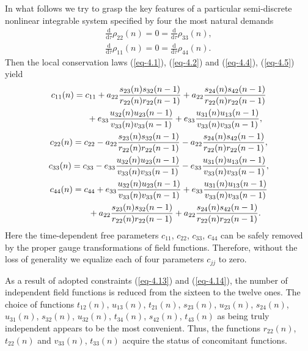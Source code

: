 \documentclass[pdftex]{sigma}
\numberwithin{equation}{section}
\begin{document}
In what follows we try to grasp the key features of a particular semi-discrete nonlinear integrable system specified by four the most natural demands
\begin{gather}\label{eq-4.13}
	\frac{\mathrm{d}}{\mathrm{d}\tau}\rho_{22}(n)=0=\frac{\mathrm{d}}{\mathrm{d}\tau}\rho_{33}(n),
\\ \label{eq-4.14}
	\frac{\mathrm{d}}{\mathrm{d}\tau}\rho_{11}(n)=0=\frac{\mathrm{d}}{\mathrm{d}\tau}\rho_{44}(n) .
\end{gather}
Then the local conservation laws (\ref{eq-4.1}), (\ref{eq-4.2}) and (\ref{eq-4.4}), (\ref{eq-4.5}) yield
\begin{gather}
	c_{11}(n)=c_{11}+a_{22}\frac{s_{23}(n)s_{32}(n-1)}{r_{22}(n)r_{22}(n-1)}+ a_{22}\frac{s_{24}(n)s_{42}(n-1)}{r_{22}(n)r_{22}(n-1)}\nonumber\\
\hphantom{c_{11}(n)=}{}
+e_{33}\frac{u_{32}(n)u_{23}(n-1)}{v_{33}(n)v_{33}(n-1)}+ e_{33}\frac{u_{31}(n)u_{13}(n-1)}{v_{33}(n)v_{33}(n-1)},\label{eq-4.15}
\\
	c_{22}(n)=c_{22}-a_{22}\frac{s_{23}(n)s_{32}(n-1)}{r_{22}(n)r_{22}(n-1)}- a_{22}\frac{s_{24}(n)s_{42}(n-1)}{r_{22}(n)r_{22}(n-1)}, \label{eq-4.16}
\\
 c_{33}(n)=c_{33}-e_{33}\frac{u_{32}(n)u_{23}(n-1)}{v_{33}(n)v_{33}(n-1)}- e_{33}\frac{u_{31}(n)u_{13}(n-1)}{v_{33}(n)v_{33}(n-1)}, \label{eq-4.17}
\\
	c_{44}(n)=c_{44}+e_{33}\frac{u_{32}(n)u_{23}(n-1)}{v_{33}(n)v_{33}(n-1)}+ e_{33}\frac{u_{31}(n)u_{13}(n-1)}{v_{33}(n)v_{33}(n-1)}\nonumber\\
\hphantom{c_{44}(n)=}{}
	+a_{22}\frac{s_{23}(n)s_{32}(n-1)}{r_{22}(n)r_{22}(n-1)}+ a_{22}\frac{s_{24}(n)s_{42}(n-1)}{r_{22}(n)r_{22}(n-1)} . \label{eq-4.18}
\end{gather}
Here the time-dependent free parameters $c_{11}$, $c_{22}$, $c_{33}$, $c_{44}$ can be safely removed by the proper gauge transformations of field functions. Therefore, without the loss of generality we equalize each of four parameters $c_{jj}$ to zero.

As a result of adopted constraints (\ref{eq-4.13}) and (\ref{eq-4.14}), the number of independent field functions is reduced from the sixteen to the twelve ones. The choice of functions $t_{12}(n)$, $u_{13}(n)$, $t_{21}(n)$, $s_{23}(n)$, $u_{23}(n)$, $s_{24}(n)$, $u_{31}(n)$, $s_{32}(n)$, $u_{32}(n)$, $t_{34}(n)$, $s_{42}(n)$, $t_{43}(n)$ as being truly independent appears to be the most convenient. Thus, the functions $r_{22}(n)$, $t_{22}(n)$ and $v_{33}(n)$, $t_{33}(n)$ acquire the status of concomitant functions.
\end{document}
